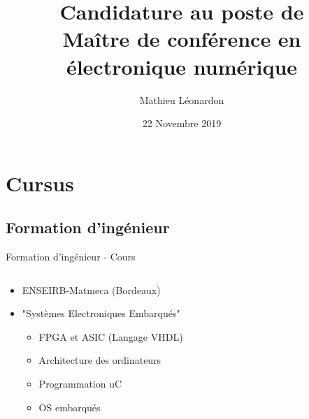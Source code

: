 \documentclass[t,compress,mathserif,12pt,xcolor=dvipsnames]{beamer}
\title{\textbf{Candidature au poste de \\ Maître de conférence en électronique numérique}}
\author[Mathieu Léonardon\hspace{3.01cm}\url{https://mathieuleonardon.com}\hspace{1.0cm}{mathieu.leonardon@ims-bordeaux.fr}]{\Large{Mathieu Léonardon}\vspace{-0.5cm}}
\date{22 Novembre 2019}
\begin{document}
\begin{frame}[t]
\titlepage
\end{frame}

\section{Cursus}
\subsection{Formation d'ingénieur}
\begin{frame}[t]{Formation d'ingénieur - Cours}
  \begin{minipage}[t][5.0cm][t]{\textwidth}
    \begin{columns}[T]
      \begin{column}{0.63\textwidth}
        \begin{itemize}
          \item<+-> ENSEIRB-Matmeca (Bordeaux)
          \item<+-> "Systèmes Electroniques Embarqués"
          \begin{itemize}
            \item<+-> FPGA et ASIC (Langage VHDL)
            \item<+-> Architecture des ordinateurs
            \item<+-> Programmation uC
            \item<+-> OS embarqués
          \end{itemize}
        \end{itemize}
      \end{column}
      \begin{column}{0.04\textwidth}


\end{column}
\end{columns}
\end{minipage}
\end{frame}
\end{document}
